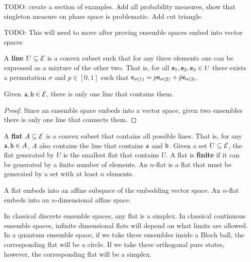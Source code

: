 TODO: create a section of examples. Add all probability measures, show that singleton measure on phase space is problematic. Add cut triangle.

TODO: This will need to move after proving ensemble spaces embed into vector spaces

\begin{defn}
	A \textbf{line} $U \subseteq \Ens$ is a convex subset such that for any three elements one can be expressed as a mixture of the other two. That is, for all $\ens_1, \ens_2, \ens_3 \in U$ there exists a permutation $\sigma$ and $p \in [0,1]$ such that $\ens_{\sigma(1)} = p \ens_{\sigma(2)} + \bar{p} \ens_{\sigma(3)}	$.
\end{defn}

\begin{prop}
	Given $\ens[a], \ens[b] \in \Ens$, there is only one line that contains them.
\end{prop}

\begin{proof}
	Since an ensemble space embeds into a vector space, given two ensembles there is only one line that connects them.
\end{proof}

\begin{defn}
	A \textbf{flat} $A \subseteq \Ens$ is a convex subset that contains all possible lines. That is, for any $\ens[a], \ens[b] \in A$, $A$ also contains the line that contains $\ens[a]$ and $\ens[b]$. Given a set $U \subseteq \Ens$, the flat generated by $U$ is the smallest flat that contains $U$. A flat is \textbf{finite} if it can be generated by a finite number of elements. An $n$-flat is a flat that must be generated by a set with at least $n$ elements.
\end{defn}

\begin{conj}
	A flat embeds into an affine subspace of the embedding vector space. An $n$-flat embeds into an $n$-dimensional affine space.
\end{conj}

\begin{remark}
	In classical discrete ensemble spaces, any flat is a simplex. In classical continuous ensemble spaces, infinite dimensional flats will depend on what limits are allowed. In a quantum ensemble space, if we take three ensembles inside a Bloch ball, the corresponding flat will be a circle. If we take three orthogonal pure states, however, the corresponding flat will be a simplex.
\end{remark}

